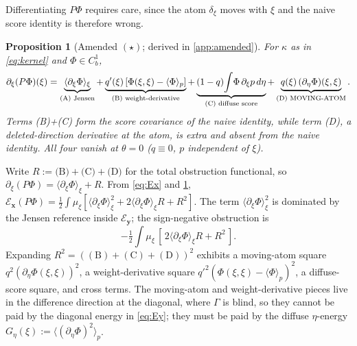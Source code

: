 \documentclass[reqno,final,11pt]{amsart}
\theoremstyle{plain}
\newtheorem{proposition}[theorem]{Proposition}
\theoremstyle{definition}
\theoremstyle{remark}
\newcommand{\cE}{\mathcal E}
\begin{document}
Differentiating $P\Phi$ requires care, since the atom $\delta_\xi$ moves
with $\xi$ and the naive score identity is therefore wrong.

\begin{proposition}[Amended $(\star)$; derived in \cref{app:amended}]\label{prop:amended-star}
For $\kappa$ as in \eqref{eq:kernel} and $\Phi\in C^1_b$,
\begin{equation}\label{eq:amended-star}
  \partial_\xi(P\Phi)(\xi)
  =\underbrace{\langle\partial_\xi\Phi\rangle_\xi}_{\textnormal{(A) Jensen}}
   +\underbrace{q'(\xi)\,[\Phi(\xi,\xi)-\langle\Phi\rangle_p]}_{\textnormal{(B) weight-derivative}}
   +\underbrace{(1-q)\!\int\!\Phi\,\partial_\xi p\,d\eta}_{\textnormal{(C) diffuse score}}
   +\underbrace{q(\xi)\,(\partial_\eta\Phi)(\xi,\xi)}_{\textnormal{(D) MOVING-ATOM}}.
\end{equation}
Terms \textnormal{(B)+(C)} form the score covariance of the naive identity, while
term \textnormal{(D)}, a deleted-direction derivative at the atom, is
extra and absent from the naive identity. All four vanish
at $\theta=0$ ($q\equiv0$, $p$ independent of $\xi$).
\end{proposition}

Write $R:=\text{(B)}+\text{(C)}+\text{(D)}$ for the total obstruction
functional, so $\partial_\xi(P\Phi)=\langle\partial_\xi\Phi\rangle_\xi+R$.
From \eqref{eq:Ex} and \cref{prop:amended-star},
$\cE_{\mathbf x}(P\Phi)=\tfrac12\int\mu_\xi[\langle\partial_\xi\Phi\rangle_\xi^2
+2\langle\partial_\xi\Phi\rangle_\xi R+R^2]$. The term
$\langle\partial_\xi\Phi\rangle_\xi^2$ is dominated by the Jensen reference
inside $\cE_{\mathbf y}$; the sign-negative obstruction is
\begin{equation}\label{eq:obstruction}
  -\tfrac12\!\int\!\mu_\xi\,[\,2\langle\partial_\xi\Phi\rangle_\xi R+R^2\,].
\end{equation}
Expanding $R^2=((\mathrm B)+(\mathrm C)+(\mathrm D))^2$ exhibits a
moving-atom square $q^2(\partial_\eta\Phi(\xi,\xi))^2$, a weight-derivative
square $q'^2(\Phi(\xi,\xi)-\langle\Phi\rangle_p)^2$, a diffuse-score square,
and cross terms. The moving-atom and weight-derivative pieces live in the
difference direction at the diagonal, where $\Gamma$ is blind, so they
cannot be paid by the diagonal energy in \eqref{eq:Ey}; they must be
paid by the diffuse $\eta$-energy $G_\eta(\xi):=\langle(\partial_\eta\Phi)^2\rangle_p$.
\end{document}
